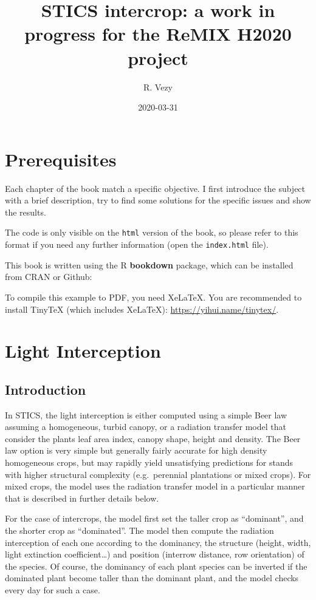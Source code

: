 \documentclass[
]{book}
\title{STICS intercrop: a work in progress for the ReMIX H2020 project}
\author{R. Vezy}
\date{2020-03-31}
\begin{document}
\maketitle

{
\setcounter{tocdepth}{1}
\tableofcontents
}
\hypertarget{prerequisites}{%
\chapter{Prerequisites}\label{prerequisites}}

Each chapter of the book match a specific objective. I first introduce the subject with a brief description, try to find some solutions for the specific issues and show the results.

The code is only visible on the \texttt{html} version of the book, so please refer to this format if you need any further information (open the \texttt{index.html} file).

This book is written using the R \textbf{bookdown} package, which can be installed from CRAN or Github:

To compile this example to PDF, you need XeLaTeX. You are recommended to install TinyTeX (which includes XeLaTeX): \url{https://yihui.name/tinytex/}.

\hypertarget{Light}{%
\chapter{Light Interception}\label{Light}}

\hypertarget{introduction}{%
\section{Introduction}\label{introduction}}

In STICS, the light interception is either computed using a simple Beer law assuming a homogeneous, turbid canopy, or a radiation transfer model that consider the plants leaf area index, canopy shape, height and density. The Beer law option is very simple but generally fairly accurate for high density homogeneous crops, but may rapidly yield unsatisfying predictions for stands with higher structural complexity (e.g.~perennial plantations or mixed crops). For mixed crops, the model uses the radiation transfer model in a particular manner that is described in further details below.

For the case of intercrops, the model first set the taller crop as ``dominant'', and the shorter crop as ``dominated''. The model then compute the radiation interception of each one according to the dominancy, the structure (height, width, light extinction coefficient\ldots) and position (interrow distance, row orientation) of the species. Of course, the dominancy of each plant species can be inverted if the dominated plant become taller than the dominant plant, and the model checks every day for such a case.
\end{document}
